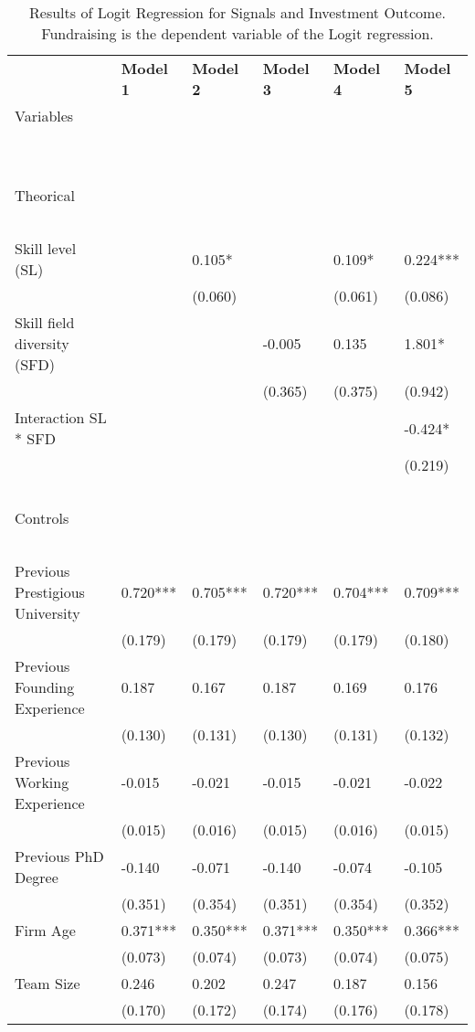 \documentclass[12pt]{article}
\begin{document}
\begin{table}[!ht]
\scriptsize
    \centering
    \caption{Results of Logit Regression for Signals and Investment Outcome. Fundraising is the dependent variable of the Logit regression.}
    \begin{tabular}{llllll}
        \toprule
        ~ & \textbf{Model 1} & \textbf{Model 2} & \textbf{Model 3} & \textbf{Model 4} & \textbf{Model 5} \\
        Variables & ~ & ~ & ~ & ~ & ~ \\
        ~ & ~ & ~ & ~ & ~ & ~ \\
        \midrule
        ~ & ~ & ~ & ~ & ~ & ~ \\
        Theorical & ~ & ~ & ~ & ~ & ~ \\
        & ~ & ~ & ~ & ~ & ~ \\
        Skill level (SL) & ~ & 0.105* & ~ & 0.109* & 0.224*** \\
        ~ & ~ & (0.060) & ~ & (0.061) & (0.086) \\
        Skill field diversity (SFD) & ~ & ~ & -0.005 & 0.135 & 1.801* \\
        ~ & ~ & ~ & (0.365) & (0.375) & (0.942) \\
        Interaction SL * SFD & ~ & ~ & ~ & ~ & -0.424* \\
        ~ & ~ & ~ & ~ & ~ & (0.219) \\
        ~ & ~ & ~ & ~ & ~ & ~ \\
        Controls & ~ & ~ & ~ & ~ & ~ \\
        & ~ & ~ & ~ & ~ & ~ \\
        Previous Prestigious University & 0.720*** & 0.705*** & 0.720*** & 0.704*** & 0.709*** \\
        ~ & (0.179) & (0.179) & (0.179) & (0.179) & (0.180) \\
        Previous Founding Experience & 0.187 & 0.167 & 0.187 & 0.169 & 0.176 \\
        ~ & (0.130) & (0.131) & (0.130) & (0.131) & (0.132) \\
        Previous Working Experience & -0.015 & -0.021 & -0.015 & -0.021 & -0.022 \\
        ~ & (0.015) & (0.016) & (0.015) & (0.016) & (0.015) \\
        Previous PhD Degree & -0.140 & -0.071 & -0.140 & -0.074 & -0.105 \\
        ~ & (0.351) & (0.354) & (0.351) & (0.354) & (0.352) \\
        Firm Age & 0.371*** & 0.350*** & 0.371*** & 0.350*** & 0.366*** \\
        ~ & (0.073) & (0.074) & (0.073) & (0.074) & (0.075) \\
        Team Size & 0.246 & 0.202 & 0.247 & 0.187 & 0.156 \\
        ~ & (0.170) & (0.172) & (0.174) & (0.176) & (0.178) \\


\end{tabular}
\end{table}
\end{document}
